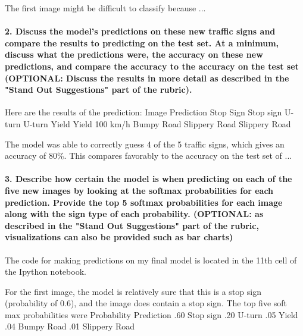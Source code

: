 \documentclass[11pt]{article}
\begin{document}
The first image might be difficult to classify because ...

\paragraph{2. Discuss the model's predictions on these new traffic signs
and compare the results to predicting on the test set. At a minimum,
discuss what the predictions were, the accuracy on these new
predictions, and compare the accuracy to the accuracy on the test set
(OPTIONAL: Discuss the results in more detail as described in the "Stand
Out Suggestions" part of the
rubric).}\label{discuss-the-models-predictions-on-these-new-traffic-signs-and-compare-the-results-to-predicting-on-the-test-set.-at-a-minimum-discuss-what-the-predictions-were-the-accuracy-on-these-new-predictions-and-compare-the-accuracy-to-the-accuracy-on-the-test-set-optional-discuss-the-results-in-more-detail-as-described-in-the-stand-out-suggestions-part-of-the-rubric.}

Here are the results of the prediction: Image Prediction Stop Sign Stop
sign U-turn U-turn Yield Yield 100 km/h Bumpy Road Slippery Road
Slippery Road

The model was able to correctly guess 4 of the 5 traffic signs, which
gives an accuracy of 80\%. This compares favorably to the accuracy on
the test set of ...

\paragraph{3. Describe how certain the model is when predicting on each
of the five new images by looking at the softmax probabilities for each
prediction. Provide the top 5 softmax probabilities for each image along
with the sign type of each probability. (OPTIONAL: as described in the
"Stand Out Suggestions" part of the rubric, visualizations can also be
provided such as bar
charts)}\label{describe-how-certain-the-model-is-when-predicting-on-each-of-the-five-new-images-by-looking-at-the-softmax-probabilities-for-each-prediction.-provide-the-top-5-softmax-probabilities-for-each-image-along-with-the-sign-type-of-each-probability.-optional-as-described-in-the-stand-out-suggestions-part-of-the-rubric-visualizations-can-also-be-provided-such-as-bar-charts}

The code for making predictions on my final model is located in the 11th
cell of the Ipython notebook.

For the first image, the model is relatively sure that this is a stop
sign (probability of 0.6), and the image does contain a stop sign. The
top five soft max probabilities were Probability Prediction .60 Stop
sign .20 U-turn .05 Yield .04 Bumpy Road .01 Slippery Road
\end{document}

